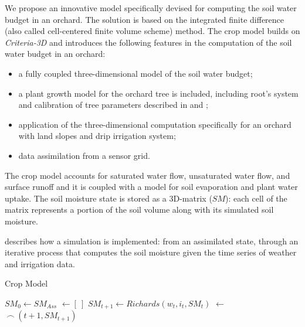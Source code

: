 We propose an innovative model specifically devised for computing the soil water budget in an orchard.
The solution is based on the integrated finite difference (also called cell-centered finite volume scheme) method.
The crop model builds on \textit{Criteria-3D} \cite{bittelli-etal-2015} and introduces the following features in the computation of the soil water budget in an orchard:
\begin{itemize}
 \item a fully coupled three-dimensional model of the soil water budget;
    \item a plant growth model for the orchard tree is included, including root's system and calibration of tree parameters described in  and ;
    \item application of the three-dimensional computation specifically for an orchard with land slopes and drip irrigation system;
    \item data assimilation from a sensor grid.
\end{itemize}


The crop model accounts for saturated water flow, unsaturated water flow, and surface runoff and it is coupled with a model for soil evaporation and plant water uptake. The soil moisture state is stored as a 3D-matrix ($SM$): each cell of the matrix represents a portion of the soil volume along with its simulated soil moisture.

 describes how a simulation is implemented: from an assimilated state, through an iterative process that computes the soil moisture given the time series of weather and irrigation data.

\begin{algorithm}[t]
\caption{Crop Model}
\begin{algorithmic}[1]
    \State $SM_0 \gets SM_{Ass}$ 
    \State \SMt $\gets [~]$ 
     
        \State $SM_{t+1} \gets  Richards(w_t, i_t, SM_t)$ 
        \State \SMt $\gets$ \SMt $~\frown~(t+1, SM_{t+1})$ 
    \EndFor
    \State \Return \SMt {}
\end{algorithmic}
\label{alg:ocrchad3d-lab}
\end{algorithm}

